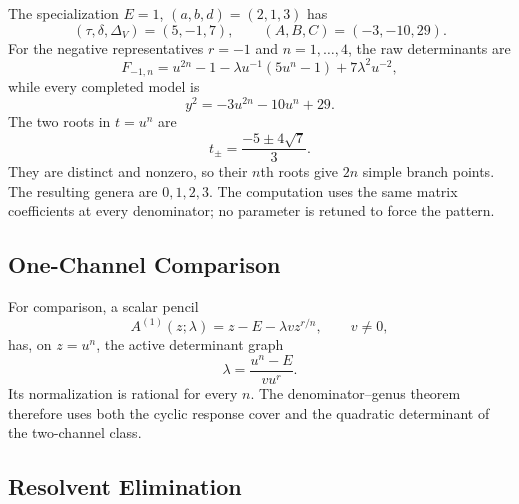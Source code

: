 \documentclass[11pt,reqno]{amsart}
\theoremstyle{remark}
\begin{document}
The specialization $E=1$, $(a,b,d)=(2,1,3)$ has
\begin{equation}\label{eq:app-generic-invariants}
 (\tau,\delta,\Delta_V)=(5,-1,7),
 \qquad
 (A,B,C)=(-3,-10,29).
\end{equation}
For the negative representatives $r=-1$ and $n=1,\ldots,4$, the raw
determinants are
\begin{equation}\label{eq:app-low-raw}
 F_{-1,n}=u^{2n}-1
 -\lambda u^{-1}(5u^n-1)+7\lambda^2u^{-2},
\end{equation}
while every completed model is
\begin{equation}\label{eq:app-low-Q}
 y^2=-3u^{2n}-10u^n+29.
\end{equation}
The two roots in $t=u^n$ are
\begin{equation}\label{eq:app-low-t-roots}
 t_\pm=\frac{-5\pm4\sqrt7}{3}.
\end{equation}
They are distinct and nonzero, so their $n$th roots give $2n$ simple branch
points.  The resulting genera are $0,1,2,3$.  The computation uses the same
matrix coefficients at every denominator; no parameter is retuned to force
the pattern.

\subsection{One-Channel Comparison}

For comparison, a scalar pencil
\begin{equation}\label{eq:app-one-channel}
 A^{(1)}(z;\lambda)=z-E-\lambda v z^{r/n},
 \qquad v\ne0,
\end{equation}
has, on $z=u^n$, the active determinant graph
\begin{equation}\label{eq:app-one-channel-graph}
 \lambda=\frac{u^n-E}{vu^r}.
\end{equation}
Its normalization is rational for every $n$.  The denominator--genus theorem
therefore uses both the cyclic response cover and the quadratic determinant
of the two-channel class.

\subsection{Resolvent Elimination}
\end{document}
